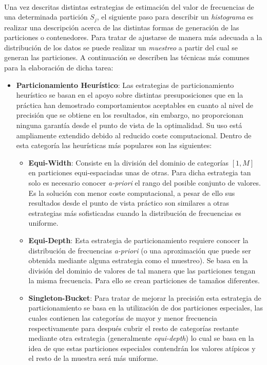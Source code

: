 \documentclass{subfiles}
\begin{document}
        \paragraph{}
        Una vez descritas distintas estrategias de estimación del valor de frecuencias de una determinada partición $S_j$, el siguiente paso para describir un \emph{histograma} es realizar una descripción acerca de las distintas formas de generación de las particiones o contenedores. Para tratar de ajustarse de manera más adecuada a la distribución de los datos se puede realizar un \emph{muestreo} a partir del cual se generan las particiones. A continuación se describen las técnicas más comunes para la elaboración de dicha tarea:

        \begin{itemize}

          \item \textbf{Particionamiento Heurístico}: Las estrategias de particionamiento heurístico se basan en el apoyo sobre distintas presuposiciones que en la práctica han demostrado comportamientos aceptables en cuanto al nivel de precisión que se obtiene en los resultados, sin embargo, no proporcionan ninguna garantía desde el punto de vista de la optimalidad. Su uso está ampliamente extendido debido al reducido coste computacional. Dentro de esta categoría las heurísticas más populares son las siguientes:
            \begin{itemize}

              \item \textbf{Equi-Width}: Consiste en la división del dominio de categorías $[1,M]$ en particiones equi-espaciadas unas de otras. Para dicha estrategia tan solo es necesario conocer \emph{a-priori} el rango del posible conjunto de valores. Es la solución con menor coste computacional, a pesar de ello sus resultados desde el punto de vista práctico son similares a otras estrategias más sofisticadas cuando la distribución de frecuencias es uniforme.

              \item \textbf{Equi-Depth}: Esta estrategia de particionamiento requiere conocer la distribución de frecuencias \emph{a-priori} (o una aproximación que puede ser obtenida mediante alguna estrategia como el muestreo). Se basa en la división del dominio de valores de tal manera que las particiones tengan la misma frecuencia. Para ello se crean particiones de tamaños diferentes.

              \item \textbf{Singleton-Bucket}: Para tratar de mejorar la precisión esta estrategia de particionamiento se basa en la utilización de dos particiones especiales, las cuales contienen las categorías de mayor y menor frecuencia respectivamente para después cubrir el resto de categorías restante mediante otra estrategia (generalmente \emph{equi-depth}) lo cual se basa en la idea de que estas particiones especiales contendrán los valores atípicos y el resto de la muestra será más uniforme.


\end{itemize}
\end{itemize}
\end{document}
